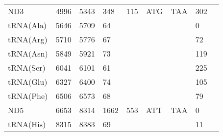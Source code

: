 \documentclass[../DISSERTACAO_MAIN.tex]{subfiles}
\begin{document}
\begin{longtable}{llllllllllllllllllllll}
			ND3          & \multicolumn{2}{l}{4996}    & \multicolumn{2}{l}{5343}    & \multicolumn{2}{l}{348}         & \multicolumn{3}{l}{115}                       & \multicolumn{3}{l}{ATG}   & \multicolumn{3}{l}{TAA}     & \multicolumn{3}{l}{302}         & \multicolumn{3}{l}{}         \\
			tRNA(Ala)    & \multicolumn{2}{l}{5646}    & \multicolumn{2}{l}{5709}    & \multicolumn{2}{l}{64}          & \multicolumn{3}{l}{}                          & \multicolumn{3}{l}{}      & \multicolumn{3}{l}{}        & \multicolumn{3}{l}{0}           & \multicolumn{3}{l}{}         \\
			tRNA(Arg)    & \multicolumn{2}{l}{5710}    & \multicolumn{2}{l}{5776}    & \multicolumn{2}{l}{67}          & \multicolumn{3}{l}{}                          & \multicolumn{3}{l}{}      & \multicolumn{3}{l}{}        & \multicolumn{3}{l}{72}          & \multicolumn{3}{l}{}         \\
			tRNA(Asn)    & \multicolumn{2}{l}{5849}    & \multicolumn{2}{l}{5921}    & \multicolumn{2}{l}{73}          & \multicolumn{3}{l}{}                          & \multicolumn{3}{l}{}      & \multicolumn{3}{l}{}        & \multicolumn{3}{l}{119}         & \multicolumn{3}{l}{}         \\
			tRNA(Ser)    & \multicolumn{2}{l}{6041}    & \multicolumn{2}{l}{6101}    & \multicolumn{2}{l}{61}          & \multicolumn{3}{l}{}                          & \multicolumn{3}{l}{}      & \multicolumn{3}{l}{}        & \multicolumn{3}{l}{225}         & \multicolumn{3}{l}{}         \\
			tRNA(Glu)    & \multicolumn{2}{l}{6327}    & \multicolumn{2}{l}{6400}    & \multicolumn{2}{l}{74}          & \multicolumn{3}{l}{}                          & \multicolumn{3}{l}{}      & \multicolumn{3}{l}{}        & \multicolumn{3}{l}{105}         & \multicolumn{3}{l}{}         \\
			tRNA(Phe)    & \multicolumn{2}{l}{6506}    & \multicolumn{2}{l}{6573}    & \multicolumn{2}{l}{68}          & \multicolumn{3}{l}{}                          & \multicolumn{3}{l}{}      & \multicolumn{3}{l}{}        & \multicolumn{3}{l}{79}          & \multicolumn{3}{l}{}         \\
			ND5          & \multicolumn{2}{l}{6653}    & \multicolumn{2}{l}{8314}    & \multicolumn{2}{l}{1662}        & \multicolumn{3}{l}{553}                       & \multicolumn{3}{l}{ATT}   & \multicolumn{3}{l}{TAA}     & \multicolumn{3}{l}{0}           & \multicolumn{3}{l}{}         \\
			tRNA(His)    & \multicolumn{2}{l}{8315}    & \multicolumn{2}{l}{8383}    & \multicolumn{2}{l}{69}          & \multicolumn{3}{l}{}                          & \multicolumn{3}{l}{}      & \multicolumn{3}{l}{}        & \multicolumn{3}{l}{11}          & \multicolumn{3}{l}{}         \\

\end{longtable}
\end{document}
